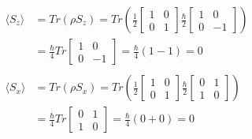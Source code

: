 \documentclass{article}
\begin{document}
\begin{align*}
\langle S_z \rangle &= Tr(\rho S_z) = Tr\left( \frac{1}{2} \begin{bmatrix} 1 & 0 \\ 0 & 1 \end{bmatrix} \frac{\hbar}{2} \begin{bmatrix} 1 & 0 \\ 0 & -1 \end{bmatrix} \right) \\
&= \frac{\hbar}{4} Tr \begin{bmatrix} 1 & 0 \\ 0 & -1 \end{bmatrix} = \frac{\hbar}{4} (1 - 1) = 0 \\\\
\langle S_x \rangle &= Tr(\rho S_x) = Tr\left( \frac{1}{2} \begin{bmatrix} 1 & 0 \\ 0 & 1 \end{bmatrix} \frac{\hbar}{2} \begin{bmatrix} 0 & 1 \\ 1 & 0 \end{bmatrix} \right) \\
&= \frac{\hbar}{4} Tr \begin{bmatrix} 0 & 1 \\ 1 & 0 \end{bmatrix} = \frac{\hbar}{4} (0 + 0) = 0
\end{align*}
\end{document}
